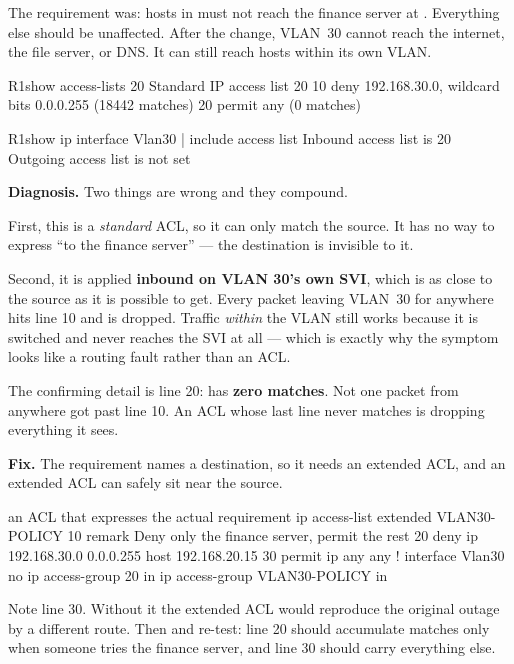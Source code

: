 \begin{breakfix}
The requirement was: hosts in  must not reach the finance
server at . Everything else should be unaffected. After the
change, VLAN~30 cannot reach the internet, the file server, or DNS. It can still
reach hosts within its own VLAN.

\begin{verify}{R1}{show access-lists 20}
Standard IP access list 20
    10 deny   192.168.30.0, wildcard bits 0.0.0.255 (18442 matches)
    20 permit any (0 matches)
\end{verify}

\begin{verify}{R1}{show ip interface Vlan30 | include access list}
  Inbound  access list is 20
  Outgoing access list is not set
\end{verify}

\textbf{Diagnosis.} Two things are wrong and they compound.

First, this is a \emph{standard} ACL, so it can only match the source. It has no
way to express ``to the finance server'' --- the destination is invisible to it.

Second, it is applied \textbf{inbound on VLAN 30's own SVI}, which is as close to
the source as it is possible to get. Every packet leaving VLAN~30 for anywhere
hits line 10 and is dropped. Traffic \emph{within} the VLAN still works because
it is switched and never reaches the SVI at all --- which is exactly why the
symptom looks like a routing fault rather than an ACL.

The confirming detail is line 20:  has \textbf{zero matches}. Not
one packet from anywhere got past line 10. An ACL whose last line never matches
is dropping everything it sees.

\textbf{Fix.} The requirement names a destination, so it needs an extended ACL,
and an extended ACL can safely sit near the source.

\begin{config}{an ACL that expresses the actual requirement}
ip access-list extended VLAN30-POLICY
 10 remark Deny only the finance server, permit the rest
 20 deny   ip 192.168.30.0 0.0.0.255 host 192.168.20.15
 30 permit ip any any
!
interface Vlan30
 no ip access-group 20 in
 ip access-group VLAN30-POLICY in
\end{config}

Note line 30. Without it the extended ACL would reproduce the original outage by
a different route. Then  and re-test: line 20
should accumulate matches only when someone tries the finance server, and line 30
should carry everything else.
\end{breakfix}

